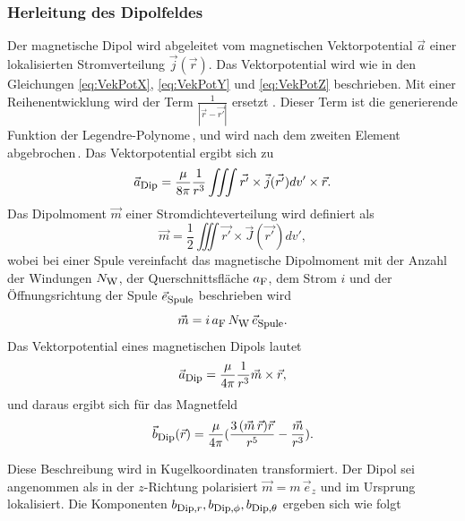 \subsubsection{Herleitung des Dipolfeldes}
Der magnetische Dipol wird abgeleitet vom magnetischen Vektorpotential $\vec{a}$ einer lokalisierten Stromverteilung $\vec{j}(\vec{r})$. Das Vektorpotential wird wie in den Gleichungen \ref{eq:VekPotX}, \ref{eq:VekPotY} und \ref{eq:VekPotZ} beschrieben. Mit einer Reihenentwicklung wird der Term $\frac{1}{|\vec{r}-\vec{r'}|}$ ersetzt \cite{zeidler_springer-taschenbuch_2013}. Dieser Term ist die generierende Funktion der Legendre-Polynome\,\cite{chan_legendre_2013}, und wird nach dem zweiten Element abgebrochen\,\cite{john_david_jackson_klassische_nodate}. Das Vektorpotential ergibt sich zu 
\begin{equation}
    \vec{a}_{\textrm{\footnotesize{Dip}}} = \frac{\mu}{8 \pi} \frac{1}{r^3} \iiint \vec{r'} \times \vec{j}(\vec{r'})dv' \times \vec{r}.
    \label{eq:VekPotDipol}
\end{equation}
Das Dipolmoment $\vec{m}$ einer Stromdichteverteilung wird definiert als \cite{wolfgang_nolting_grundkurs_nodate} 
\begin{equation}
    \vec{m} = \frac{1}{2} \iiint \vec{r'} \times \vec{J}(\vec{r'})dv',
    \label{eq:Dipolemoment}
\end{equation}
wobei bei einer Spule vereinfacht das magnetische Dipolmoment mit der Anzahl der Windungen $N_{\textrm{\footnotesize{W}}}$, der Querschnittsfläche $a_{\textrm{\footnotesize{F}}}$, dem Strom $i$ und der Öffnungsrichtung der Spule $\vec{e}_{\textrm{\footnotesize{Spule}}}$ beschrieben wird
\begin{equation}
    \vec{m} = i\,a_{\textrm{\footnotesize{F}}}\,N_{\textrm{\footnotesize{W}}}\, \vec{e}_{\textrm{\footnotesize{Spule}}}.
\end{equation}
Das Vektorpotential eines magnetischen Dipols lautet \cite{wolfgang_nolting_grundkurs_nodate}
\begin{equation}
    \vec{a}_{\textrm{\footnotesize{Dip}}} = \frac{\mu}{4 \pi} \frac{1}{r^3} \vec{m} \times \vec{r},
    \label{eq:VekPotDipoleMom}
\end{equation}
und daraus ergibt sich für das Magnetfeld \cite{wolfgang_nolting_grundkurs_nodate}
\begin{equation}
    \vec{b}_{\textrm{\footnotesize{Dip}}}(\vec{r}) = \frac{\mu}{4 \pi} (\frac{3\,(\vec{m}\,\vec{r})\vec{r}}{r^5}-\frac{\vec{m}}{r^3}).
    \label{eq:MagDipoleFeld}
\end{equation}

Diese Beschreibung wird in Kugelkoordinaten transformiert. Der Dipol sei angenommen als in der $z$-Richtung polarisiert $\vec{m}= m\, \vec{e}_z$ und im Ursprung lokalisiert. Die Komponenten $b_{\textrm{\footnotesize{Dip,$r$}}}, b_{\textrm{\footnotesize{Dip,$\phi$}}}, b_{\textrm{\footnotesize{Dip,$\theta$}}}$ ergeben sich wie folgt\,\cite{henke_elektromagnetische_nodate}

